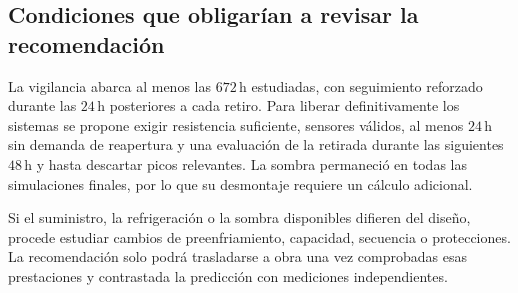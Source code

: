 \subsection{Condiciones que obligarían a revisar la recomendación}
La vigilancia abarca al menos las $672\,\mathrm h$ estudiadas, con seguimiento reforzado durante las $24\,\mathrm h$ posteriores a cada retiro. Para liberar definitivamente los sistemas se propone exigir resistencia suficiente, sensores válidos, al menos $24\,\mathrm h$ sin demanda de reapertura y una evaluación de la retirada durante las siguientes $48\,\mathrm h$ y hasta descartar picos relevantes. La sombra permaneció en todas las simulaciones finales, por lo que su desmontaje requiere un cálculo adicional.

Si el suministro, la refrigeración o la sombra disponibles difieren del diseño, procede estudiar cambios de preenfriamiento, capacidad, secuencia o protecciones. La recomendación solo podrá trasladarse a obra una vez comprobadas esas prestaciones y contrastada la predicción con mediciones independientes.
